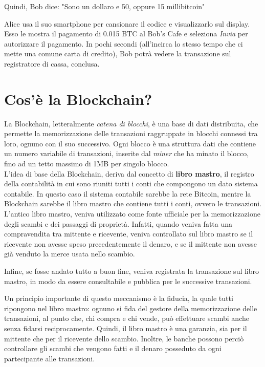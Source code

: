 Quindi, Bob dice: "Sono un dollaro e 50, oppure 15 millibitcoin"

Alice usa il suo smartphone per cansionare il codice e visualizzarlo sul display. Esso le mostra il pagamento di 0.015 BTC al Bob's Cafe e seleziona \textit{Invia} per autorizzare il pagamento. In pochi secondi (all'incirca lo stesso tempo che ci mette una comune carta di credito), Bob potrà vedere la transazione sul registratore di cassa, conclusa.\cite{antonopoulos2014mastering}

\section{Cos'è la Blockchain?}
La Blockchain, letteralmente \textit{catena di blocchi}, è una base di dati distribuita, che permette la memorizzazione delle transazioni raggruppate in blocchi connessi tra loro, ognuno con il suo successivo. Ogni blocco è una struttura dati che contiene un numero variabile di transazioni, inserite dal \textit{miner} che ha minato il blocco, fino ad un tetto massimo di 1MB per singolo blocco.\\

L'idea di base della Blockchain, deriva dal concetto di \textbf{libro mastro}, il registro della contabilità in cui sono riuniti tutti i conti che compongono un dato sistema contabile. In questo caso il sistema contabile sarebbe la rete Bitcoin, mentre la Blockchain sarebbe il libro mastro che contiene tutti i conti, ovvero le transazioni. \\

L'antico libro mastro, veniva utilizzato come fonte ufficiale per la memorizzazione degli scambi e dei passaggi di proprietà. Infatti, quando veniva fatta una compravendita tra mittente e ricevente, veniva controllato sul libro mastro se il ricevente non avesse speso precedentemente il denaro, e se il mittente non avesse già venduto la merce usata nello scambio.

Infine, se fosse andato tutto a buon fine, veniva registrata la transazione sul libro mastro, in modo da essere consultabile e pubblica per le successive transazioni.

Un principio importante di questo meccanismo è la fiducia, la quale tutti ripongono nel libro mastro: ognuno si fida del gestore della memorizzazione delle transazioni, al punto che, chi compra e chi vende, può effettuare scambi anche senza fidarsi reciprocamente. Quindi, il libro mastro è una garanzia, sia per il mittente che per il ricevente dello scambio. Inoltre, le banche possono perciò controllare gli scambi che vengono fatti e il denaro posseduto da ogni partecipante alle transazioni.


